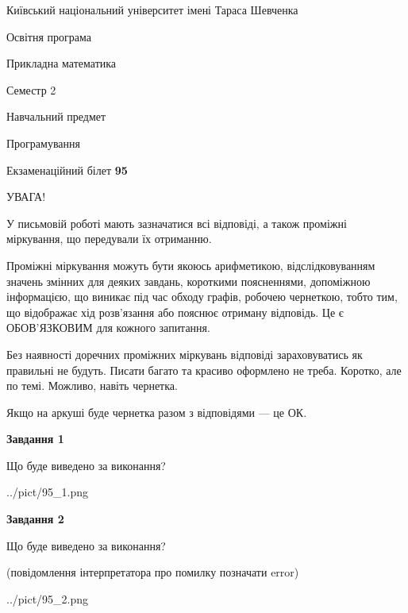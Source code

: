 \documentclass[12pt, ukrainian]{article}
\begin{document}
{{\begin {small}\par
{ \center  Київський національний університет імені Тараса Шевченка \par}
{\parbox {5 cm}{Освітня програма \hfill}{\parbox {7 cm}{Прикладна математика\hfill}}\parbox {6 cm}{\hfill Семестр 2}}\par
{\parbox {5 cm} {Навчальний предмет \hfill}\parbox {7 cm}{Програмування \hfill}\parbox {6cm}{\hfill}\par}\vspace{-7pt} \end{small}}{\center Екзаменаційний білет \No \textbf
{ 95 }\par}}
{
\begin {large}
УВАГА!

У письмовій роботі мають зазначатися всі відповіді, а також проміжні міркування, що передували їх отриманню.

Проміжні міркування можуть бути якоюсь арифметикою, відслідковуванням зна\-чень змінних для деяких завдань,
короткими поясненнями, допоміжною інформацією, що виникає під час обходу графів, робочею чернеткою,
тобто тим, що відображає хід розв’язання або пояснює отриману відповідь.
Це є ОБОВ’ЯЗКОВИМ для кожного запитання.

Без наявності доречних проміжних міркувань відповіді зараховуватись як правиль\-ні не будуть.
Писати багато та красиво оформлено не треба. Коротко, але по темі. Можли\-во, навіть чернетка.

Якщо на аркуші буде чернетка разом з відповідями --- це ОК.

\newpage

{\begin {center}\textbf{Завдання 1}\end {center}}\par
Що буде виведено за виконання?\par
\begin{center}
	{../pict/95_1.png}
\end{center}
\newpage

{\begin {center}\textbf{Завдання 2}\end {center}}\par
Що буде виведено за виконання?\par
 (повідомлення інтерпретатора про помилку позначати error)\par
\begin{center}
	{../pict/95_2.png}
\end{center}
\newpage


\end{large}}
\end{document}
